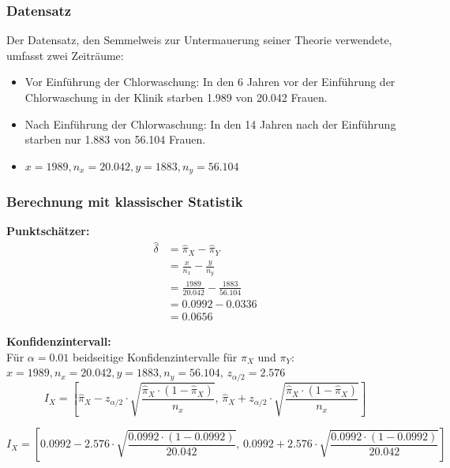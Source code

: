 \documentclass[a4paper,12pt]{article}
\begin{document}
\subsubsection{Datensatz}
Der Datensatz, den Semmelweis zur Untermauerung seiner Theorie verwendete, umfasst zwei Zeiträume: 
\begin{itemize}
    \item Vor Einführung der Chlorwaschung: In den 6 Jahren vor der Einführung der Chlorwaschung in der Klinik starben 1.989 von 20.042 Frauen.
    \item Nach Einführung der Chlorwaschung: In den 14 Jahren nach der Einführung starben nur 1.883 von 56.104 Frauen.
    \item $x = 1989, n_x = 20.042, y = 1883, n_y = 56.104$
\end{itemize}

\subsubsection{Berechnung mit klassischer Statistik}
\textbf{Punktschätzer:} 
\begin{align}
  \hat{\delta} &= \hat{\pi}_X - \hat{\pi}_Y \\
  &= \frac{x}{n_x} - \frac{y}{n_y} \\
  &= \frac{1989}{20.042} - \frac{1883}{56.104} \\
  &= 0.0992 - 0.0336 \\
  &= 0.0656
\end{align}

\textbf{Konfidenzintervall:} \\
Für $\alpha = 0.01$ beidseitige Konfidenzintervalle für $\pi_X$ und $\pi_Y$: \\
$x = 1989, n_x = 20.042, y = 1883, n_y = 56.104$, $z_{\alpha/2} = 2.576$ \\

\begin{equation}
  I_X = \left[\hat{\pi}_X - z_{\alpha/2} \cdot \sqrt{\frac{\hat{\pi}_X \cdot (1-\hat{\pi}_X)}{n_x}}, \, 
  \hat{\pi}_X + z_{\alpha/2} \cdot \sqrt{\frac{\hat{\pi}_X \cdot (1-\hat{\pi}_X)}{n_x}}\right]
\end{equation}

\begin{equation}
  I_X = \left[0.0992 - 2.576 \cdot \sqrt{\frac{0.0992 \cdot (1-0.0992)}{20.042}}, \, 
  0.0992 + 2.576 \cdot \sqrt{\frac{0.0992 \cdot (1-0.0992)}{20.042}}\right]
\end{equation}
\end{document}
